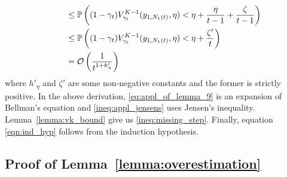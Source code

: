 \begin{myproof}[Proof.]
\begin{align}
	& \qquad \le \P{ (1-\gamma_t)V^{K-1}_{\gamma_{t}}(y_{1,N_1(t)}, \eta)< \eta + \frac{\eta}{t-1} +  \frac{\zeta}{t-1}} \nonumber \\
	& \qquad \le \P{ (1-\gamma_t)V^{K-1}_{\gamma_{t}}(y_{1,N_1(t)}, \eta)< \eta +   \frac{\zeta'}{t}} \nonumber \\
	&\qquad =  \mathcal{O}\left(\frac{1}{t^{1 + h'_\eta}}\right) \label{eqn:ind_hyp}
	\end{align}
	where $h'_\eta$ and $\zeta'$ are some non-negative constants and the former is strictly positive. In the above derivation, \eqref{eq:appl_of_lemma_9} is an expansion of Bellman's equation and \eqref{ineq:appl_jensens} uses Jensen's inequality. 
	Lemma~\ref{lemma:vk_bound} give us \eqref{ineq:missing_step}. %
	Finally, equation \eqref{eqn:ind_hyp} follows from the induction hypothesis.
\end{myproof}

\subsection{Proof of Lemma~\ref{lemma:overestimation}} \label{proof:overestimation_proof}


